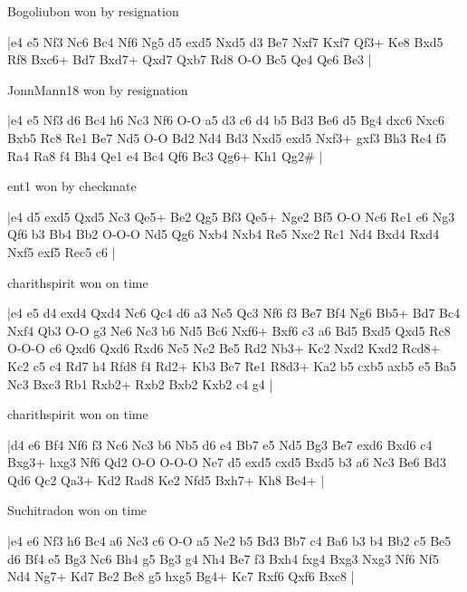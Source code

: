 \showboard

Bogoliubon won by resignation

\makegametitle
|e4 e5 Nf3 Nc6 Bc4 Nf6 Ng5 d5 exd5 Nxd5 d3 Be7 Nxf7 Kxf7 Qf3+ Ke8 Bxd5 Rf8 Bxc6+ Bd7 Bxd7+ Qxd7 Qxb7 Rd8 O-O Bc5 Qe4 Qe6 Be3  |

\showboard

JonnMann18 won by resignation

\makegametitle
|e4 e5 Nf3 d6 Bc4 h6 Nc3 Nf6 O-O a5 d3 c6 d4 b5 Bd3 Be6 d5 Bg4 dxc6 Nxc6 Bxb5 Rc8 Re1 Be7 Nd5 O-O Bd2 Nd4 Bd3 Nxd5 exd5 Nxf3+ gxf3 Bh3 Re4 f5 Ra4 Ra8 f4 Bh4 Qe1 e4 Bc4 Qf6 Bc3 Qg6+ Kh1 Qg2\#  |

\showboard

ent1 won by checkmate

\makegametitle
|e4 d5 exd5 Qxd5 Nc3 Qe5+ Be2 Qg5 Bf3 Qe5+ Nge2 Bf5 O-O Nc6 Re1 e6 Ng3 Qf6 b3 Bb4 Bb2 O-O-O Nd5 Qg6 Nxb4 Nxb4 Re5 Nxc2 Rc1 Nd4 Bxd4 Rxd4 Nxf5 exf5 Rec5 c6  |

\showboard

charithspirit won on time

\makegametitle
|e4 e5 d4 exd4 Qxd4 Nc6 Qc4 d6 a3 Ne5 Qc3 Nf6 f3 Be7 Bf4 Ng6 Bb5+ Bd7 Bc4 Nxf4 Qb3 O-O g3 Ne6 Nc3 b6 Nd5 Bc6 Nxf6+ Bxf6 c3 a6 Bd5 Bxd5 Qxd5 Rc8 O-O-O c6 Qxd6 Qxd6 Rxd6 Nc5 Ne2 Be5 Rd2 Nb3+ Kc2 Nxd2 Kxd2 Rcd8+ Kc2 c5 c4 Rd7 h4 Rfd8 f4 Rd2+ Kb3 Bc7 Re1 R8d3+ Ka2 b5 cxb5 axb5 e5 Ba5 Nc3 Bxc3 Rb1 Rxb2+ Rxb2 Bxb2 Kxb2 c4 g4  |

\showboard

charithspirit won on time

\makegametitle
|d4 e6 Bf4 Nf6 f3 Nc6 Nc3 b6 Nb5 d6 e4 Bb7 e5 Nd5 Bg3 Be7 exd6 Bxd6 c4 Bxg3+ hxg3 Nf6 Qd2 O-O O-O-O Ne7 d5 exd5 cxd5 Bxd5 b3 a6 Nc3 Be6 Bd3 Qd6 Qc2 Qa3+ Kd2 Rad8 Ke2 Nfd5 Bxh7+ Kh8 Be4+  |

\showboard

Suchitradon won on time

\makegametitle
|e4 e6 Nf3 h6 Bc4 a6 Nc3 c6 O-O a5 Ne2 b5 Bd3 Bb7 c4 Ba6 b3 b4 Bb2 c5 Be5 d6 Bf4 e5 Bg3 Nc6 Bh4 g5 Bg3 g4 Nh4 Be7 f3 Bxh4 fxg4 Bxg3 Nxg3 Nf6 Nf5 Nd4 Ng7+ Kd7 Be2 Bc8 g5 hxg5 Bg4+ Kc7 Rxf6 Qxf6 Bxc8  |

